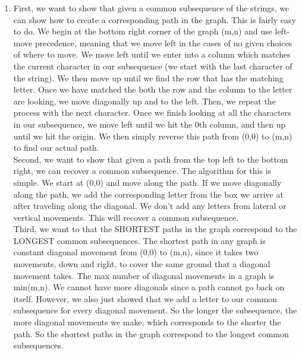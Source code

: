 \documentclass[12pt]{article}
\begin{document}
\begin{enumerate}[label=(\alph*)]
    \item First, we want to show that given a common subsequence of the strings, we can show how to create a corresponding path in the graph. This is fairly easy to do. We begin at the bottom right corner of the graph (m,n) and use left-move precedence, meaning that we move left in the cases of no given choices of where to move. We move left until we enter into a column which matches the current character in our subsequence (we start with the last character of the string). We then move up until we find the row that has the matching letter. Once we have matched the both the row and the column to the letter are looking, we move diagonally up and to the left. Then, we repeat the process with the next character. Once we finish looking at all the characters in our subsequence, we move left until we hit the 0th column, and then up until we hit the origin. We then simply reverse this path from (0,0) to (m,n) to find our actual path.\\

    Second, we want to show that given a path from the top left to the bottom right, we can recover a common subsequence. The algorithm for this is simple. We start at (0,0) and move along the path. If we move diagonally along the path, we add the corresponding letter from the box we arrive at after traveling along the diagonal. We don't add any letters from lateral or vertical movements. This will recover a common subsequence.\\

    Third, we want to that the SHORTEST paths in the graph correspond to the LONGEST common subsequences. The shortest path in any graph is constant diagonal movement from (0,0) to (m,n), since it takes two movements, down and right, to cover the same ground that a diagonal movement takes. The max number of diagonal movements in a graph is min(m,n). We cannot have more diagonals since a path cannot go back on itself. However, we also just showed that we add a letter to our common subsequence for every diagonal movement. So the longer the subsequence, the more diagonal movements we make, which corresponds to the shorter the path. So the shortest paths in the graph correspond to the longest common subsequences.\\
\end{enumerate}
\end{document}
